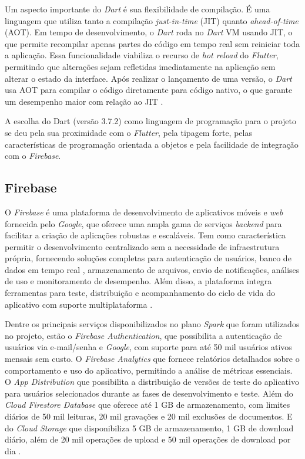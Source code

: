 Um aspecto importante do \textit{Dart} é sua flexibilidade de compilação. 
É uma linguagem que utiliza tanto a compilação \textit{just-in-time} 
(JIT) quanto \textit{ahead-of-time} (AOT). 
Em tempo de desenvolvimento, o \textit{Dart} roda no \textit{Dart} VM 
usando JIT, o que permite recompilar apenas partes 
do código em tempo real sem reiniciar toda a aplicação. Essa funcionalidade 
viabiliza o recurso de \textit{hot reload} do \textit{Flutter}, permitindo 
que alterações sejam refletidas imediatamente na aplicação sem alterar o 
estado da interface.
Após realizar o lançamento de uma versão, o \textit{Dart} usa AOT para compilar o código diretamente 
para código nativo, o que garante um desempenho maior com relação ao JIT \cite{dartDocs2025}.

A escolha do Dart (versão 3.7.2) como linguagem de programação para o projeto se deu pela sua
proximidade com o \textit{Flutter}, pela tipagem forte, pelas características de 
programação orientada a objetos e pela facilidade de integração com o \textit{Firebase}.

\subsection{Firebase}

O \textit{Firebase} é uma plataforma de desenvolvimento de aplicativos móveis e \textit{web} 
fornecida pelo \textit{Google}, que oferece uma ampla gama de serviços \textit{backend} para 
facilitar a criação de aplicações robustas e escaláveis. Tem como característica 
permitir o desenvolvimento centralizado sem a necessidade de infraestrutura própria, 
fornecendo soluções completas para autenticação de usuários, banco de dados em tempo real
, armazenamento de arquivos, envio de notificações, análises de uso e monitoramento de 
desempenho. Além disso, a plataforma integra ferramentas para teste, distribuição 
e acompanhamento do ciclo de vida do aplicativo com suporte multiplataforma \cite{firebase2025}.

Dentre os principais serviços disponibilizados no plano \textit{Spark} que foram 
utilizados no projeto, estão o \textit{Firebase Authentication}, 
que possibilita a autenticação de usuários via e-mail/senha e \textit{Google}, com suporte 
para até 50 mil usuários ativos mensais sem custo. O \textit{Firebase Analytics} que fornece 
relatórios detalhados sobre o comportamento e uso do aplicativo, permitindo a 
análise de métricas essenciais. O \textit{App Distribution} que possibilita a distribuição de versões 
de teste do aplicativo para usuários selecionados durante as fases de desenvolvimento e teste. 
Além do \textit{Cloud Firestore Database} que oferece até 1 GB de armazenamento, com limites diários de 50 
mil leituras, 20 mil gravações e 20 mil exclusões de documentos. E do \textit{Cloud Storage} que
disponibiliza 5 GB de armazenamento, 1 GB de download diário, além de 20 mil operações 
de upload e 50 mil operações de download por dia \cite{firebase2025}.

